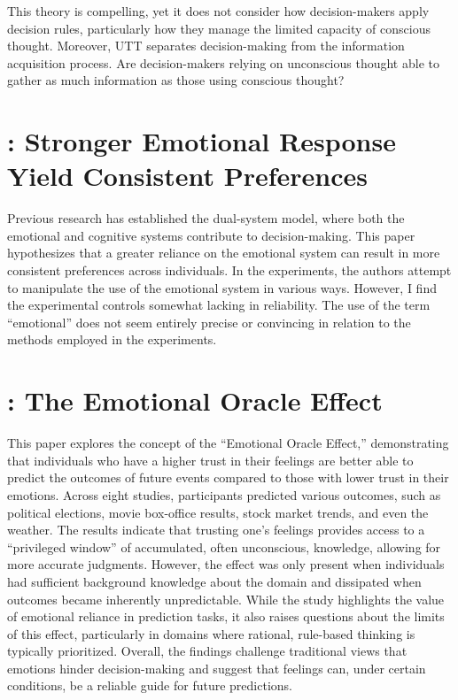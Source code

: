 \documentclass[11pt]{elegantbook}
\begin{document}
This theory is compelling, yet it does not consider how decision-makers apply decision rules, particularly how they manage the limited capacity of conscious thought. Moreover, UTT separates decision-making from the information acquisition process. Are decision-makers relying on unconscious thought able to gather as much information as those using conscious thought?

\section{\cite{lee2009search}: Stronger Emotional Response Yield Consistent Preferences}
Previous research has established the dual-system model, where both the emotional and cognitive systems contribute to decision-making. This paper hypothesizes that a greater reliance on the emotional system can result in more consistent preferences across individuals. In the experiments, the authors attempt to manipulate the use of the emotional system in various ways. However, I find the experimental controls somewhat lacking in reliability. The use of the term “emotional” does not seem entirely precise or convincing in relation to the methods employed in the experiments.


\section{\cite{pham2012feeling}: The Emotional Oracle Effect}
This paper explores the concept of the “Emotional Oracle Effect,” demonstrating that individuals who have a higher trust in their feelings are better able to predict the outcomes of future events compared to those with lower trust in their emotions. Across eight studies, participants predicted various outcomes, such as political elections, movie box-office results, stock market trends, and even the weather. The results indicate that trusting one’s feelings provides access to a “privileged window” of accumulated, often unconscious, knowledge, allowing for more accurate judgments. However, the effect was only present when individuals had sufficient background knowledge about the domain and dissipated when outcomes became inherently unpredictable. While the study highlights the value of emotional reliance in prediction tasks, it also raises questions about the limits of this effect, particularly in domains where rational, rule-based thinking is typically prioritized. Overall, the findings challenge traditional views that emotions hinder decision-making and suggest that feelings can, under certain conditions, be a reliable guide for future predictions.
\end{document}
